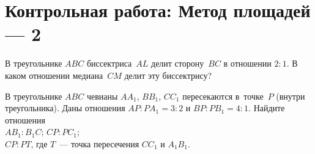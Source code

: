 
\section*{Контрольная работа: Метод площадей --- 2}




\begin{problems}

\item
В треугольнике $ABC$ биссектриса~$AL$ делит сторону~$BC$ в отношении $2 : 1$.
В каком отношении медиана~$CM$ делит эту биссектрису?

\item
В треугольнике $ABC$ чевианы $A A_1$, $B B_1$, $C C_1$ пересекаются
в~точке~$P$ (внутри треугольника).
Даны отношения $AP : P A_1 = 3 : 2$ и $BP : P B_1 = 4 : 1$.
Найдите отношения
\\
\subproblem $A B_1 : B_1 C$;
\quad
\subproblem $CP : P C_1$;
\\
\subproblem $CP : PT$, где $T$~--- точка пересечения $C C_1$ и $A_1 B_1$.




\end{problems}

